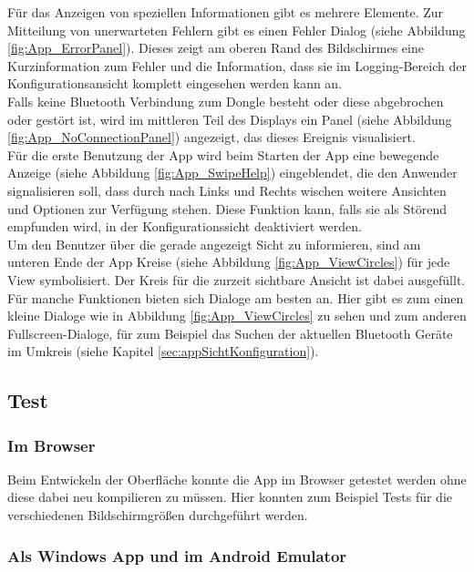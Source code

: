 Für das Anzeigen von speziellen Informationen gibt es mehrere Elemente. Zur Mitteilung von unerwarteten Fehlern gibt es einen Fehler Dialog (siehe Abbildung \ref{fig:App_ErrorPanel}). Dieses zeigt am oberen Rand des Bildschirmes eine Kurzinformation zum Fehler und die Information, dass sie im Logging-Bereich der Konfigurationsansicht komplett eingesehen werden kann an.
\\
Falls keine Bluetooth Verbindung zum Dongle besteht oder diese abgebrochen oder gestört ist, wird im mittleren Teil des Displays ein Panel (siehe Abbildung \ref{fig:App_NoConnectionPanel}) angezeigt, das dieses Ereignis visualisiert.
\\
Für die erste Benutzung der App wird beim Starten der App eine bewegende Anzeige (siehe Abbildung \ref{fig:App_SwipeHelp}) eingeblendet, die den Anwender signalisieren soll, dass durch nach Links und Rechts wischen weitere Ansichten und Optionen zur Verfügung stehen. Diese Funktion kann, falls sie als Störend empfunden wird, in der Konfigurationssicht deaktiviert werden. 
\\
Um den Benutzer über die gerade angezeigt Sicht zu informieren, sind am unteren Ende der App Kreise (siehe Abbildung \ref{fig:App_ViewCircles}) für jede View symbolisiert. Der Kreis für die zurzeit sichtbare Ansicht ist dabei ausgefüllt.
\\
Für manche Funktionen bieten sich Dialoge am besten an. Hier gibt es zum einen kleine Dialoge wie in Abbildung \ref{fig:App_ViewCircles} zu sehen und zum anderen Fullscreen-Dialoge, für zum Beispiel das Suchen der aktuellen Bluetooth Geräte im Umkreis (siehe Kapitel \ref{sec:appSichtKonfiguration}).

\subsection{Test}
\label{sec:appTest}


\subsubsection{Im Browser}

Beim Entwickeln der Oberfläche konnte die App im Browser getestet werden ohne diese dabei neu kompilieren zu müssen. Hier konnten zum Beispiel Tests für die verschiedenen Bildschirmgrößen durchgeführt werden.

\subsubsection{Als Windows App und im Android Emulator}

